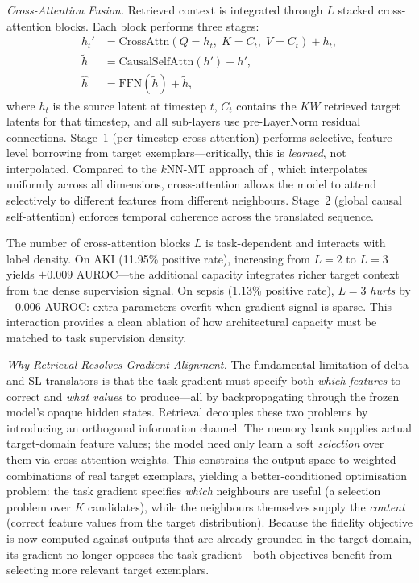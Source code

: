 \vspace{0.3em}
\noindent\textit{Cross-Attention Fusion.}\quad
Retrieved context is integrated through $L$ stacked cross-attention blocks.
Each block performs three stages:
\begin{equation}
\label{eq:cross_attn}
\begin{aligned}
h_t' &= \mathrm{CrossAttn}(Q{=}h_t,\; K{=}C_t,\; V{=}C_t) + h_t, \\
\tilde{h} &= \mathrm{CausalSelfAttn}(h') + h', \\
\hat{h} &= \mathrm{FFN}(\tilde{h}) + \tilde{h},
\end{aligned}
\end{equation}
where $h_t$ is the source latent at timestep $t$, $C_t$ contains the $KW$ retrieved target latents for that timestep, and all sub-layers use pre-LayerNorm residual connections.
Stage~1 (per-timestep cross-attention) performs selective, feature-level borrowing from target exemplars---critically, this is \emph{learned}, not interpolated.
Compared to the $k$NN-MT approach of \citet{khandelwal2021knnmt}, which interpolates uniformly across all dimensions, cross-attention allows the model to attend selectively to different features from different neighbours.
Stage~2 (global causal self-attention) enforces temporal coherence across the translated sequence.

The number of cross-attention blocks $L$ is task-dependent and interacts with label density.
On AKI (11.95\% positive rate), increasing from $L{=}2$ to $L{=}3$ yields $+0.009$ AUROC---the additional capacity integrates richer target context from the dense supervision signal.
On sepsis (1.13\% positive rate), $L{=}3$ \emph{hurts} by $-0.006$ AUROC: extra parameters overfit when gradient signal is sparse.
This interaction provides a clean ablation of how architectural capacity must be matched to task supervision density.

\vspace{0.3em}
\noindent\textit{Why Retrieval Resolves Gradient Alignment.}\quad
The fundamental limitation of delta and SL translators is that the task gradient must specify both \emph{which features} to correct and \emph{what values} to produce---all by backpropagating through the frozen model's opaque hidden states.
Retrieval decouples these two problems by introducing an orthogonal information channel.
The memory bank supplies actual target-domain feature values; the model need only learn a soft \emph{selection} over them via cross-attention weights.
This constrains the output space to weighted combinations of real target exemplars, yielding a better-conditioned optimisation problem: the task gradient specifies \emph{which} neighbours are useful (a selection problem over $K$ candidates), while the neighbours themselves supply the \emph{content} (correct feature values from the target distribution).
Because the fidelity objective is now computed against outputs that are already grounded in the target domain, its gradient no longer opposes the task gradient---both objectives benefit from selecting more relevant target exemplars.

